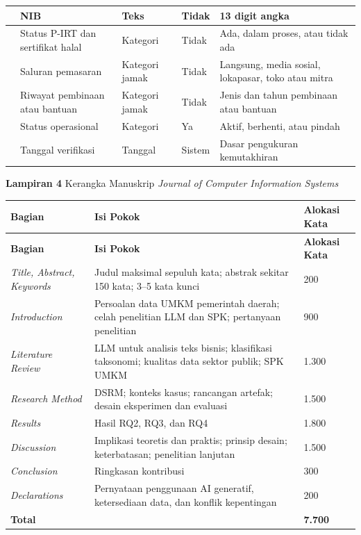 \documentclass[12pt,a4paper]{report}
\begin{document}
{\begin{longtable}{|>{\centering\arraybackslash}p{}|L{0.20\textwidth}|L{0.15\textwidth}|L{0.10\textwidth}|L{0.38\textwidth}|}
15 & NIB & Teks & Tidak & 13 digit angka \\  & Status P-IRT dan sertifikat halal & Kategori & Tidak & Ada, dalam proses, atau tidak ada \\  & Saluran pemasaran & Kategori jamak & Tidak & Langsung, media sosial, lokapasar, toko atau mitra \\  & Riwayat pembinaan atau bantuan & Kategori jamak & Tidak & Jenis dan tahun pembinaan atau bantuan \\  & Status operasional & Kategori & Ya & Aktif, berhenti, atau pindah \\  & Tanggal verifikasi & Tanggal & Sistem & Dasar pengukuran kemutakhiran \\ \hline
\end{longtable}
}

\newpage
\noindent\textbf{Lampiran 4} Kerangka Manuskrip \textit{Journal of Computer Information Systems}%
{}

\vspace{1em}
{\footnotesize
\setlength{\tabcolsep}{4pt}
\renewcommand{\arraystretch}{1.15}
\begin{longtable}{|L{0.30\textwidth}|L{0.45\textwidth}|L{0.15\textwidth}|}
\hline
\textbf{Bagian} & \textbf{Isi Pokok} & \textbf{Alokasi Kata} \\ \hline
\endfirsthead
\hline
\textbf{Bagian} & \textbf{Isi Pokok} & \textbf{Alokasi Kata} \\ \hline
\endhead
\textit{Title, Abstract, Keywords} & Judul maksimal sepuluh kata; abstrak sekitar 150 kata; 3--5 kata kunci & 200 \\ \hline
\textit{Introduction} & Persoalan data UMKM pemerintah daerah; celah penelitian LLM dan SPK; pertanyaan penelitian & 900 \\ \hline
\textit{Literature Review} & LLM untuk analisis teks bisnis; klasifikasi taksonomi; kualitas data sektor publik; SPK UMKM & 1.300 \\ \hline
\textit{Research Method} & DSRM; konteks kasus; rancangan artefak; desain eksperimen dan evaluasi & 1.500 \\ \hline
\textit{Results} & Hasil RQ2, RQ3, dan RQ4 & 1.800 \\ \hline
\textit{Discussion} & Implikasi teoretis dan praktis; prinsip desain; keterbatasan; penelitian lanjutan & 1.500 \\ \hline
\textit{Conclusion} & Ringkasan kontribusi & 300 \\ \hline
\textit{Declarations} & Pernyataan penggunaan AI generatif, ketersediaan data, dan konflik kepentingan & 200 \\ \hline
\textbf{Total} & & \textbf{7.700} \\ \hline
\end{longtable}
}
\end{document}
